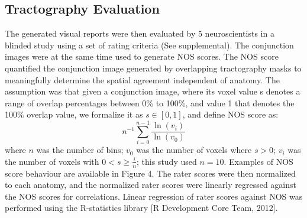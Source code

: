 \subsection{Tractography Evaluation}
The generated visual reports were then evaluated by 5 neuroscientists in a blinded study using a set of rating criteria (See supplemental). The conjunction images were at the same time used to generate NOS scores. The NOS score quantified the conjunction image generated by overlapping tractography masks to meaningfully determine the spatial agreement independent of anatomy. The assumption was that given a conjunction image, where its voxel value s denotes a range of overlap percentages between 0\% to 100\%, and value 1 that denotes the 100\% overlap value, we formalize it as $ s\in[0,1]$, and define NOS score as: 
\begin{equation}
n^{-1} \sum_{i=0}^{n-1} \frac{\ln(v_i)}{\ln(v_0)}
\end{equation}
where $n$ was the number of bins; $v_0$ was the number of voxels where $s > 0$;  $v_i$ was the number of voxels with $ 0 < s \ge \frac{i}{n}$; this study used $n=10$. Examples of NOS score behaviour are available in Figure 4. 
The rater scores were then normalized to each anatomy, and the normalized rater scores were linearly regressed against the NOS scores for correlations. Linear regression of rater scores against NOS was performed using the R-statistics library [R Development Core Team, 2012]. 

